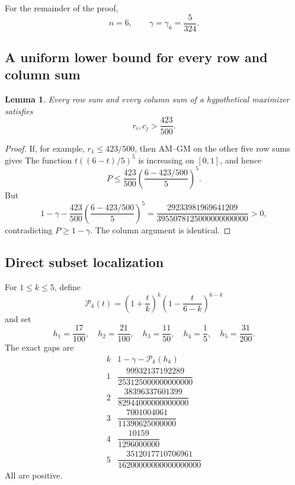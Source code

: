 \documentclass[11pt]{article}
\numberwithin{equation}{section}
\newtheorem{lemma}[theorem]{Lemma}
\theoremstyle{definition}
\begin{document}
For the remainder of the proof,
\[
 n=6,
 \qquad \gamma=\gamma_6=\frac5{324}.
\]

\subsection{A uniform lower bound for every row and column sum}

\begin{lemma}\label{n6:lem:row-floor}
Every row sum and every column sum of a hypothetical maximizer satisfies
\begin{equation}
 r_i,c_j>\frac{423}{500}.\label{n6:eq:row-floor}
\end{equation}
\end{lemma}

\begin{proof}
If, for example, $r_1\le423/500$, then AM--GM on the other five row sums gives
The function $t((6-t)/5)^5$ is increasing on $[0,1]$, and hence
\[
 P\le
 \frac{423}{500}
 \left(\frac{6-423/500}{5}\right)^5.
\]
But
\[
 1-\gamma-
 \frac{423}{500}
 \left(\frac{6-423/500}{5}\right)^5
 =
 \frac{29233981969641209}
 {3955078125000000000000}>0,
\]
contradicting $P\ge1-\gamma$.  The column argument is identical.
\end{proof}

\subsection{Direct subset localization}

For $1\le k\le5$, define
\[
 \mathcal P_k(t)
 =\left(1+\frac tk\right)^k
  \left(1-\frac t{6-k}\right)^{6-k}
\]
and set
\begin{equation}
 h_1=\frac{17}{100},
 \quad h_2=\frac{21}{100},
 \quad h_3=\frac{11}{50},
 \quad h_4=\frac15,
 \quad h_5=\frac{31}{200}.\label{n6:eq:h-table}
\end{equation}
The exact gaps are
\begin{equation}
\begin{array}{c|c}
 k&1-\gamma-\mathcal P_k(h_k)\\ \hline
1&\dfrac{99932137192289}{253125000000000000}\\[2mm]
2&\dfrac{38396337601399}{82944000000000000}\\[2mm]
3&\dfrac{7001004061}{11390625000000}\\[2mm]
4&\dfrac{10159}{1296000000}\\[2mm]
5&\dfrac{3512017710706961}{16200000000000000000}
\end{array}\label{n6:eq:subset-gaps}
\end{equation}
All are positive.
\end{document}
